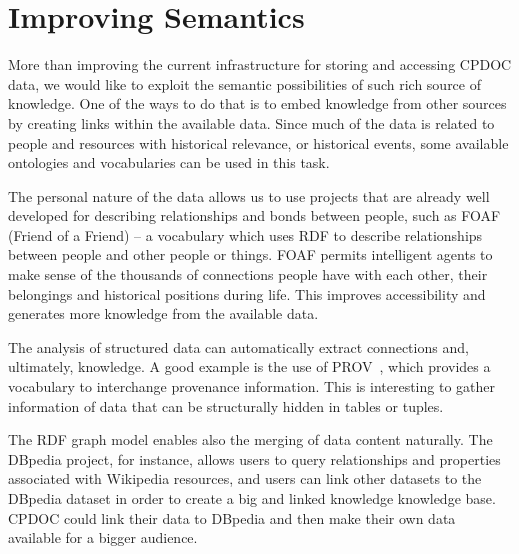 
\section{Improving Semantics}\label{sec:mapping}

More than improving the current infrastructure for storing and
accessing CPDOC data, we would like to exploit the semantic
possibilities of such rich source of knowledge. One of the ways to do
that is to embed knowledge from other sources by creating links within
the available data. Since much of the data is related to people and
resources with historical relevance, or historical events, some
available ontologies and vocabularies can be used in this task.

The personal nature of the data allows us to use projects that are
already well developed for describing relationships and bonds between
people, such as FOAF~\cite{foaf} (Friend of a Friend) -- a vocabulary
which uses RDF to describe relationships between people and other
people or things. FOAF permits intelligent agents to make sense of the
thousands of connections people have with each other, their belongings
and historical positions during life. This improves accessibility and
generates more knowledge from the available data.

The analysis of structured data can automatically extract connections
and, ultimately, knowledge. A good example is the use of
PROV~\cite{prov}, which provides a vocabulary to interchange
provenance information. This is interesting to gather information of
data that can be structurally hidden in tables or tuples.  

The RDF graph model enables also the merging of data content
naturally. The DBpedia project, for instance, allows users to query
relationships and properties associated with Wikipedia resources, and
users can link other datasets to the DBpedia dataset in order to
create a big and linked knowledge knowledge base. CPDOC could
link their data to DBpedia and then make their own data available for a 
bigger audience.

